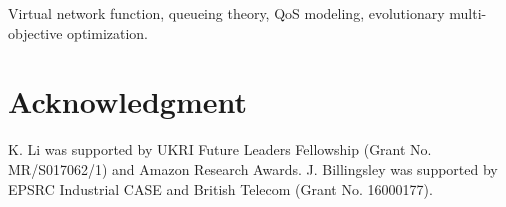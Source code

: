 \documentclass[journal]{IEEEtran}
\begin{document}
\begin{IEEEkeywords}
	Virtual network function, queueing theory, QoS modeling, evolutionary multi-objective optimization.
\end{IEEEkeywords}















\section*{Acknowledgment}
K. Li was supported by UKRI Future Leaders Fellowship (Grant No. MR/S017062/1) and Amazon Research Awards. J. Billingsley was supported by EPSRC Industrial CASE and British Telecom (Grant No. 16000177).



\end{document}
